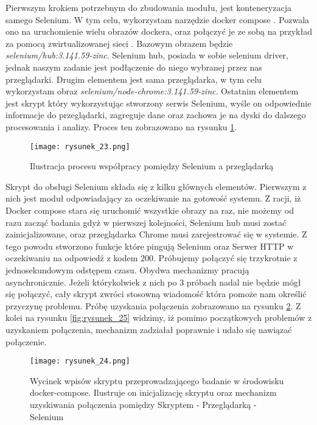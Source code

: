 Pierwszym krokiem potrzebnym do zbudowania modułu, jest konteneryzacja samego Selenium.
W tym celu, wykorzystam narzędzie docker compose \cite{docker-compose}.
Pozwala ono na uruchomienie wielu obrazów dockera, oraz połączyć je ze sobą na przykład za pomocą zwirtualizowanej sieci \cite{docker-compose-network}.
Bazowym obrazem będzie \emph{selenium/hub:3.141.59-zinc}.
Selenium hub, posiada w sobie selenium driver, jednak naszym zadanie jest podłączenie do niego wybranej przez nas przeglądarki.
Drugim elementem jest sama przeglądarka, w tym celu wykorzystam obraz \emph{selenium/node-chrome:3.141.59-zinc}.
Ostatnim elementem jest skrypt który wykorzystując stworzony serwis Selenium, wyśle on odpowiednie informacje do przeglądarki,
zagreguje dane oraz zachowa je na dyski do dalszego procesowania i analizy. Proces ten zobrazowano na rysunku \ref{fig:rysunek_23}.

\begin{figure}[htbp]
    \centering
    \texttt{[image: rysunek\_23.png]}
    \caption{Ilustracja procesu współpracy pomiędzy Selenium a przeglądarką}
    \label{fig:rysunek_23}
\end{figure}

Skrypt do obsługi Selenium składa się z kilku głównych elementów. Pierwszym z nich jest moduł odpowiadający za oczekiwanie na gotowość systemu.
Z racji, iż Docker compose stara się uruchomić wszystkie obrazy na raz, nie możemy od razu zacząć badania gdyż w pierwszej kolejności,
Selenium hub musi zostać zainicjalizowane, oraz przeglądarka Chrome musi zarejestrować się w systemie.
Z tego powodu stworzono funkcje które pingują Selenium oraz Serwer HTTP w oczekiwaniu na odpowiedź z kodem 200.
Próbujemy połączyć się trzykrotnie z jednosekundowym odstępem czasu. Obydwa mechanizmy pracują asynchronicznie.
Jeżeli którykolwiek z nich po 3 próbach nadal nie będzie mógł się połączyć, cały skrypt zwróci stosowną wiadomość która pomoże nam określić przyczynę problemu.
Próbę uzyskania połączenia zobrazowano na rysunku \ref{fig:rysunek_24}.
Z kolei na rysunku \ref{fig:rysunek_25} widzimy, iż pomimo początkowych problemów z uzyskaniem połączenia, mechanizm zadziałał poprawnie i udało się nawiązać połączenie.

\begin{figure}[htbp]
    \centering
    \texttt{[image: rysunek\_24.png]}
    \caption{Wycinek wpisów skryptu przeprowadzającego badanie w środowisku docker-compose. Ilustruje on inicjalizację skryptu oraz mechanizm uzyskiwania połączenia pomiędzy Skryptem - Przeglądarką - Selenium}
    \label{fig:rysunek_24}
\end{figure}

